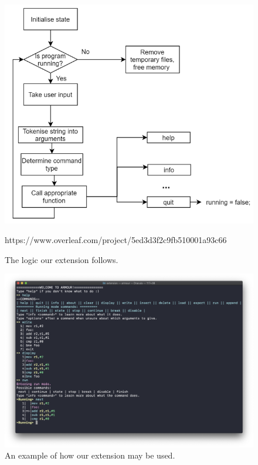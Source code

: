 \documentclass[11pt]{article}
\begin{document}
\begin{figure}[ht]
    \centering
    \includegraphics[scale = 0.4]{extensionLogic.png}
    \caption{The logic our extension follows.}
https://www.overleaf.com/project/5ed3d3f2c9fb510001a93c66    \label{fig:extensionlogic}
\end{figure}


\begin{figure}[ht]
    \centering
    \includegraphics[scale = 0.3]{armour.png}
    \caption{An example of how our extension may be used.}
    \label{fig:armour}
\end{figure}
\end{document}
